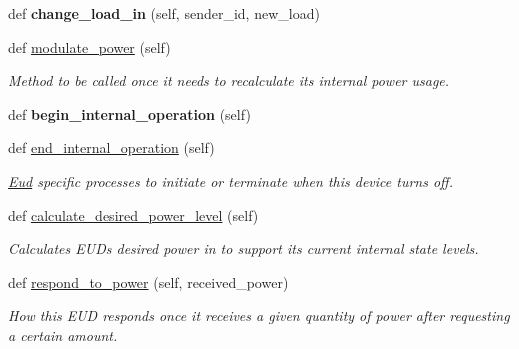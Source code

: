 \begin{DoxyCompactItemize}
\item 
\mbox{\label{class_build_1_1_objects_1_1eud_1_1_eud_a652d92e9486fef78851127b876b000ff}} 
def {\bfseries change\+\_\+load\+\_\+in} (self, sender\+\_\+id, new\+\_\+load)
\item 
def \hyperlink{class_build_1_1_objects_1_1eud_1_1_eud_a11d57b7f91d22bd696f2b29a8ac93044}{modulate\+\_\+power} (self)
\begin{DoxyCompactList}\small\item\em Method to be called once it needs to recalculate its internal power usage. \end{DoxyCompactList}\item 
\mbox{\label{class_build_1_1_objects_1_1eud_1_1_eud_a0a75866bd7e1478fa1f459bfb0da6675}} 
def {\bfseries begin\+\_\+internal\+\_\+operation} (self)
\item 
\mbox{\label{class_build_1_1_objects_1_1eud_1_1_eud_a82b817dc748e1b5db87f4e47755b64ec}} 
def \hyperlink{class_build_1_1_objects_1_1eud_1_1_eud_a82b817dc748e1b5db87f4e47755b64ec}{end\+\_\+internal\+\_\+operation} (self)
\begin{DoxyCompactList}\small\item\em \hyperlink{class_build_1_1_objects_1_1eud_1_1_eud}{Eud} specific processes to initiate or terminate when this device turns off. \end{DoxyCompactList}\item 
def \hyperlink{class_build_1_1_objects_1_1eud_1_1_eud_a690ec54ec92b3d2373858fe460013730}{calculate\+\_\+desired\+\_\+power\+\_\+level} (self)
\begin{DoxyCompactList}\small\item\em Calculates E\+UD\textquotesingle{}s desired power in to support its current internal state levels. \end{DoxyCompactList}\item 
def \hyperlink{class_build_1_1_objects_1_1eud_1_1_eud_a89a88154fdd5e8a4c9c1207eb3cb3f2f}{respond\+\_\+to\+\_\+power} (self, received\+\_\+power)
\begin{DoxyCompactList}\small\item\em How this E\+UD responds once it receives a given quantity of power after requesting a certain amount. \end{DoxyCompactList}\item 

\end{DoxyCompactItemize}
